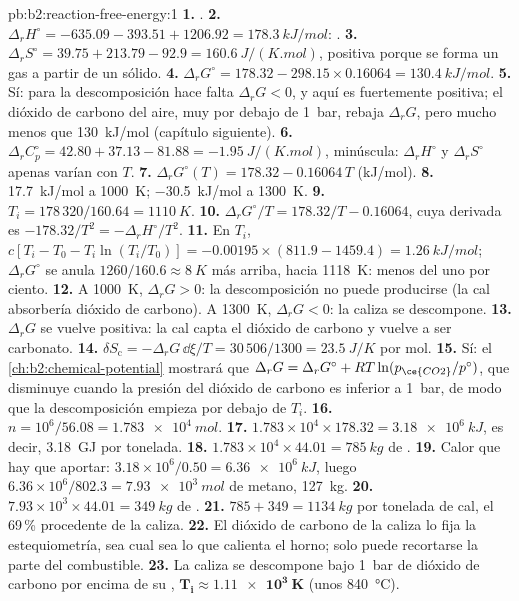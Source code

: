\begin{solution}{pb:b2:reaction-free-energy:1}
\textbf{1.} .
\textbf{2.} $\Delta_r H^\circ = -635.09 - 393.51 + 1206.92 =
\qty{+178.3}{kJ/mol}$: .
\textbf{3.} $\Delta_r S^\circ = 39.75 + 213.79 - 92.9 = \qty{+160.6}{J/(K.mol)}$,
positiva porque se forma un gas a partir de un sólido.
\textbf{4.} $\Delta_r G^\circ = 178.32 - 298.15 \times 0.16064 =
\qty{+130.4}{kJ/mol}$.
\textbf{5.} Sí: para la descomposición hace falta $\Delta_r G < 0$, y aquí es
fuertemente positiva; el dióxido de carbono del aire, muy por debajo de \qty{1}{bar},
rebaja $\Delta_r G$, pero mucho menos que \qty{130}{kJ/mol} (capítulo siguiente).
\textbf{6.} $\Delta_r C^\circ_p = 42.80 + 37.13 - 81.88 =
\qty{-1.95}{J/(K.mol)}$, minúscula: $\Delta_r H^\circ$ y $\Delta_r S^\circ$
apenas varían con $T$.
\textbf{7.} $\Delta_r G^\circ(T) = 178.32 - 0.16064\,T$ (\unit{kJ/mol}).
\textbf{8.} \qty{+17.7}{kJ/mol} a \qty{1000}{K}; \qty{-30.5}{kJ/mol} a
\qty{1300}{K}.
\textbf{9.} $T_i = 178\,320/160.64 = \qty{1110}{K}$.
\textbf{10.} $\Delta_r G^\circ/T = 178.32/T - 0.16064$, cuya derivada es
$-178.32/T^2 = -\Delta_r H^\circ/T^2$.
\textbf{11.} En $T_i$, $c[T_i - T_0 - T_i\ln(T_i/T_0)] = -0.00195 \times
(811.9 - 1459.4) = \qty{+1.26}{kJ/mol}$; $\Delta_r G^\circ$ se anula
$1260/160.6 \approx \qty{8}{K}$ más arriba, hacia \qty{1118}{K}: menos del
uno por ciento.
\textbf{12.} A \qty{1000}{K}, $\Delta_r G > 0$: la descomposición no puede
producirse (la cal absorbería dióxido de carbono). A \qty{1300}{K}, $\Delta_r G <
0$: la caliza se descompone.
\textbf{13.} $\Delta_r G$ se vuelve positiva: la cal capta el dióxido de carbono
y vuelve a ser carbonato.
\textbf{14.} $\delta S_{\text{c}} = -\Delta_r G\,\dd\xi/T = 30\,506/1300 =
\qty{23.5}{J/K}$ por mol.
\textbf{15.} Sí: el \cref{ch:b2:chemical-potential} mostrará que
$\Delta_r G = \Delta_r G^\circ + RT\ln(p_{\ce{CO2}}/p^\circ)$, que disminuye
cuando la presión del dióxido de carbono es inferior a \qty{1}{bar}, de modo que la
descomposición empieza por debajo de $T_i$.
\textbf{16.} $n = 10^6/56.08 = \qty{1.783e4}{mol}$.
\textbf{17.} $1.783 \times 10^4 \times 178.32 = \qty{3.18e6}{kJ}$, es decir,
\qty{3.18}{GJ} por tonelada.
\textbf{18.} $1.783 \times 10^4 \times 44.01 = \qty{785}{kg}$ de .
\textbf{19.} Calor que hay que aportar: $3.18 \times 10^6/0.50 = \qty{6.36e6}{kJ}$, luego
$6.36 \times 10^6/802.3 = \qty{7.93e3}{mol}$ de metano, \qty{127}{kg}.
\textbf{20.} $7.93 \times 10^3 \times 44.01 = \qty{349}{kg}$ de .
\textbf{21.} $785 + 349 = \qty{1134}{kg}$ por tonelada de cal, el 69\,\%
procedente de la caliza.
\textbf{22.} El dióxido de carbono de la caliza lo fija la estequiometría,
sea cual sea lo que calienta el horno; solo puede recortarse la parte del combustible.
\textbf{23.} La caliza se descompone bajo \qty{1}{bar} de dióxido de carbono por encima
de su , $\boldsymbol{T_i \approx \qty{1.11e3}{K}}$
(unos \qty{840}{\celsius}).
\end{solution}
